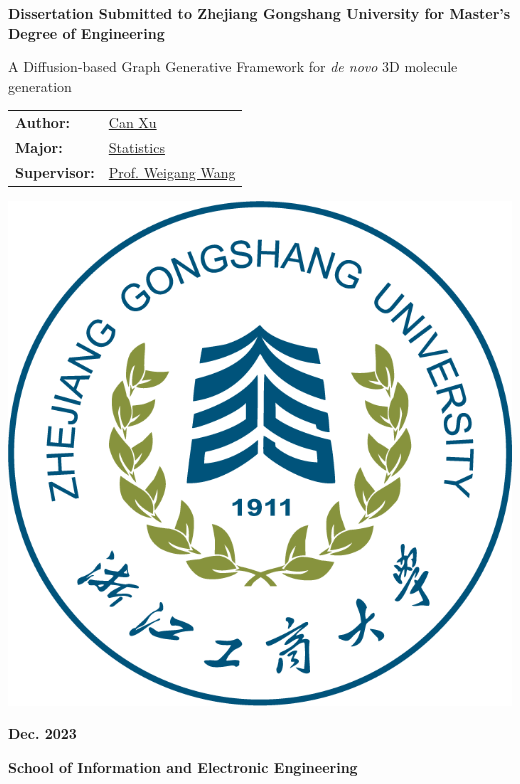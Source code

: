 \thispagestyle{cover}
\begin{center}
    \textbf{ Dissertation Submitted to Zhejiang Gongshang University for Master's Degree of Engineering}
\end{center}

\vspace{40pt}

\begin{center}
    A Diffusion-based Graph Generative Framework for {\itshape de novo} 3D molecule generation
\end{center}

\vspace{40pt}


\begin{center}
    \bfseries
    \renewcommand\arraystretch{1.1}	
    \begin{tabularx}{0.9\textwidth}{l X<{\centering}}
        \textbf{Author:} & \uline{\hfill Can Xu  \hfill} \\
        \textbf{Major:}   & \uline{ \hfill  Statistics \hfill} \\
        \textbf{Supervisor:}   &  \uline{ \hfill Prof. Weigang Wang \hfill} \\ 
    \end{tabularx}
\end{center}

\vspace{10pt}
\begin{center}
    \includegraphics[width=0.2\paperwidth]{figures/zjgsu.png}
\end{center}
\vspace{10pt}
\begin{center}
    \textbf{
        Dec. 2023}
\end{center}
\begin{center}
    \textbf{
        School of Information and Electronic Engineering}
\end{center}

